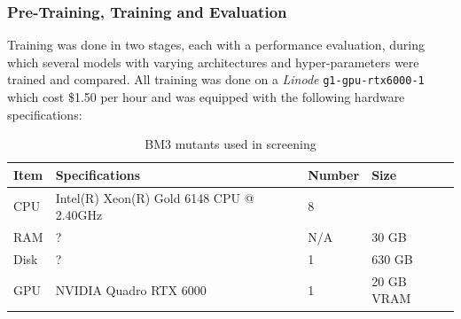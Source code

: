 \documentclass{article}
\begin{document}
\subsubsection{Pre-Training, Training and Evaluation}

Training was done in two stages, each with a performance evaluation, during which several models with varying architectures and hyper-parameters were trained and compared.
All training was done on a \textit{Linode} \texttt{g1-gpu-rtx6000-1} which cost \$1.50 per hour and was equipped with the following hardware specifications:

\begin{table}
	\begin{center}
		\caption{\label{bm3_table} BM3 mutants used in screening}
		\begin{tabular}{l|p{3cm}|l|l}
			\textbf{Item} & \textbf{Specifications} & \textbf{Number}  & \textbf{Size}\\
		\hline 
		CPU  & Intel(R) Xeon(R) Gold 6148 CPU @ 2.40GHz & 8 \\
		RAM  & ?  & N/A & 30 GB \\
		Disk & ?  & 1   & 630 GB \\
		GPU  & NVIDIA Quadro RTX 6000 & 1 & 20 GB VRAM \\ 

	\end{tabular}
	\end{center}
\end{table}
\end{document}
